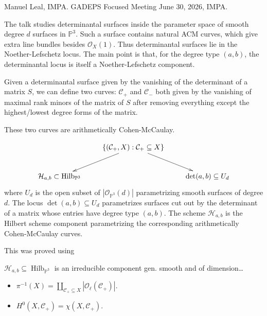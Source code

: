 \noindent
Manuel Leal, IMPA.
GADEPS Focused Meeting June 30, 2026, IMPA.

\medskip\noindent
The talk studies determinantal surfaces
inside the parameter space of smooth
degree $d$ surfaces in $\mathbb{P}^3$.
Such a surface contains natural ACM curves,
which give extra line bundles besides
$\mathcal{O}_X(1)$.
Thus determinantal surfaces lie in the
Noether-Lefschetz locus. The main point is
that, for the degree type $(a,b)$, the
determinantal locus is itself a
Noether-Lefschetz component.

\medskip\noindent
Given a determinantal surface given
by the vanishing of the determinant
of a matrix $S$, we can define two curves:
$\mathcal{C}_+$ and $\mathcal{C}_-$
both given by the vanishing of maximal
rank minors of the matrix of $S$ after
removing everything except the highest/lowest
degree forms of the matrix.

These two curves are arithmetically
Cohen-McCaulay.

\begin{theorem}[L,LH,V, 24]
\label{theorem-llhv24}
$$
\xymatrix{
&\{(\mathcal{C}_+,X):\mathcal{C}_+ \subseteq X\}
\ar[dr]\ar[dl]\\
\mathcal{H}_{a,b}\subset
\operatorname{Hilb}_{\mathbb{P}^3}
& &
\det(a,b) \subseteq U_d
}
$$
where
$U_d$ is the open subset of
$|\mathcal{O}_{\mathbb{P}^3}(d)|$
parametrizing smooth surfaces of degree $d$.
The locus $\det(a,b)\subseteq U_d$
parametrizes surfaces cut out by the
determinant of a matrix whose entries have
degree type $(a,b)$.
The scheme $\mathcal{H}_{a,b}$ is the
Hilbert scheme component parametrizing
the corresponding arithmetically
Cohen-McCaulay curves.
\end{theorem}

\noindent
This was proved using
\begin{theorem}[Ellingsrad 75]
\label{theorem-ellin75}
$\mathcal{H}_{a,b} \subseteq
\operatorname{Hilb}_{\mathbb{P}^3}$
is an irreducible component gen. smooth
and of dimension…
\end{theorem}

\begin{proposition}
\label{proposition-}
\begin{itemize}
\item $\pi^{-1}(X)
=
\coprod_{\mathcal{C}_+ \subseteq X}
|\mathcal{O}_\ell(\mathcal{C}_+)|$.
\item $H^0(X,\mathcal{C}_+)
=
\chi(X,\mathcal{C}_+)$.
\end{itemize}
\end{proposition}

